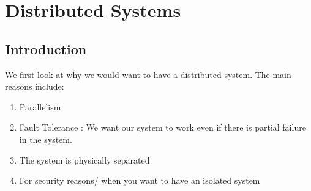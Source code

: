 \chapter{Distributed Systems}

\section{Introduction}

We first look at why we would want to have a distributed system. The main reasons include:
\begin{enumerate}
    \item Parallelism
    \item Fault Tolerance : We want our system to work even if there is partial failure in the system. 
    \item The system is physically separated
    \item For security reasons/ when you want to have an isolated system
\end{enumerate}

